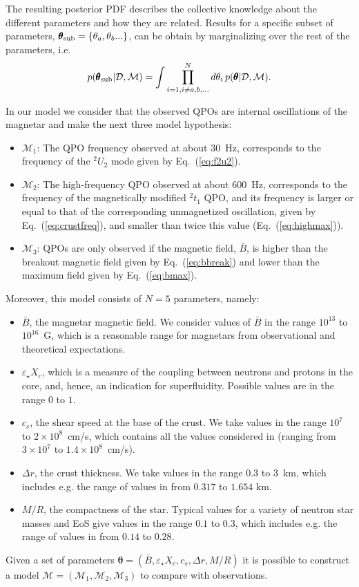 \documentclass[useAMS,usenatbib]{mnras}
\newcommand{\D}[0]{{\mathcal D}}
\newcommand{\M}[0]{{\mathcal M}}
\begin{document}
The resulting posterior PDF describes the collective knowledge about the different parameters and how they are related. Results for a specific subset of parameters, ${\pmb \theta}_{\rm sub} = \{ \theta_a,\theta_b...\}$, can be obtain by
marginalizing over the rest of the parameters, i.e.
%
\begin{equation}
p({\pmb \theta}_{\rm sub} |\D,\M) = \int \prod_{i=1, i \ne a,b,\ldots}^N d\theta_i \, p ({\pmb \theta}|\D,\M).
\end{equation}
%

In our model we consider that the observed QPOs are internal oscillations of the magnetar and make the next three model hypothesis:
\begin{itemize}
\item $\M_1$: The QPO frequency observed at about $30$~Hz, corresponds to the frequency
of the $^2U_2$ mode given by Eq.~(\ref{eq:f2u2}).

\item $\M_2$: The high-frequency QPO  observed at about $600$~Hz, corresponds to the frequency
of the magnetically modified $^2t_1$ QPO, and its frequency is 
larger or equal to that of the corresponding unmagnetized 
oscillation, given by Eq.~(\ref{eq:crustfreq}), and smaller than twice this value (Eq.~(\ref{eq:highmax})).

\item $\M_3$: QPOs are only observed if the magnetic field, $\bar{B} $, is 
higher than the breakout magnetic field given by Eq.~(\ref{eq:bbreak}) and 
lower than the maximum field given by Eq.~(\ref{eq:bmax}).

\end{itemize}
Moreover, this model consists of $N=5$ parameters, namely:
\begin{itemize}
\item $\bar B$, the magnetar magnetic field. We consider values of $\bar B$ in the range
$10^{13}$ to $10^{16}$~G, which is a reasonable range for magnetars from 
observational and theoretical expectations.
\item $\varepsilon_\star X_c$, which is a measure of the coupling between 
neutrons 
and protons in the core, and, hence, an indication for superfluidity. Possible 
values are in the range $0$ to $1$.
\item $c_s$, the shear speed at the base of the crust. We take values in the 
range $10^7$ to $2\times10^8$~cm/s, which contains all the values considered 
in \cite{Steiner2009} (ranging from $3\times10^7$ to $1.4\times10^8$~cm/s).
\item $\Delta r$, the crust thickness. We take values in the range  $0.3$ 
to $3$~km, which includes e.g. the range of values in \cite{Sotani2008} from 
$0.317$ to $1.654$ km.
\item $M/R$, the compactness of the star. Typical values for a variety of neutron star
masses and EoS give values in the range $0.1$ to $0.3$, which includes e.g. the range of 
values in \cite{Sotani2008} from $0.14$ to $0.28$.
\end{itemize}
Given a set of parameters ${\pmb \theta} = (\bar B, \varepsilon_\star X_c, c_s, 
\Delta r, M/R)$
it is possible to construct a model $\M = (\M_1, \M_2, \M_3)$ to compare with observations. 
\end{document}
